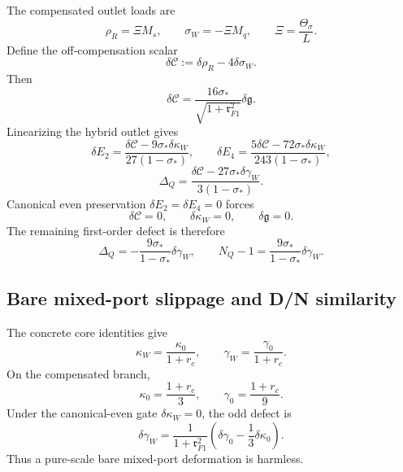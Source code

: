 The compensated outlet loads are
\begin{equation}
\rho_R=\Xi M_s,
\qquad
\sigma_W=-\Xi M_q,
\qquad
\Xi=\frac{\Theta_\sigma}{L}.
\end{equation}
Define the off-compensation scalar
\begin{equation}
\label{eq:app-part04-deltaC-def}
\delta\mathcal C:=\delta\rho_R-4\delta\sigma_W.
\end{equation}
Then
\begin{equation}
\label{eq:app-part04-deltaC-deltag}
\delta\mathcal C
=
\frac{16\sigma_*}{\sqrt{1+\mathfrak r_{F1}^2}}\delta\mathfrak g.
\end{equation}
Linearizing the hybrid outlet gives
\begin{equation}
\label{eq:app-part04-outlet-defects-linear}
\delta E_2=\frac{\delta\mathcal C-9\sigma_*\delta\kappa_W}{27(1-\sigma_*)},
\qquad
\delta E_4=\frac{5\delta\mathcal C-72\sigma_*\delta\kappa_W}{243(1-\sigma_*)},
\end{equation}
\begin{equation}
\label{eq:app-part04-DeltaQ-hybrid-linear}
\Delta_Q=\frac{\delta\mathcal C-27\sigma_*\delta\gamma_W}{3(1-\sigma_*)}.
\end{equation}
Canonical even preservation \(\delta E_2=\delta E_4=0\) forces
\begin{equation}
\label{eq:app-part04-even-gate-forces}
\delta\mathcal C=0,
\qquad
\delta\kappa_W=0,
\qquad
\delta\mathfrak g=0.
\end{equation}
The remaining first-order defect is therefore
\begin{equation}
\label{eq:app-part04-DeltaQ-deltagammaW}
\Delta_Q=-\frac{9\sigma_*}{1-\sigma_*}\delta\gamma_W,
\qquad
N_Q-1=\frac{9\sigma_*}{1-\sigma_*}\delta\gamma_W.
\end{equation}

\subsection{Bare mixed-port slippage and D/N similarity}
\label{subsec:app-part04-bare-slippage}

The concrete core identities give
\begin{equation}
\kappa_W=\frac{\kappa_0}{1+r_c},
\qquad
\gamma_W=\frac{\gamma_0}{1+r_c}.
\end{equation}
On the compensated branch,
\begin{equation}
\kappa_0=\frac{1+r_c}{3},
\qquad
\gamma_0=\frac{1+r_c}{9}.
\end{equation}
Under the canonical-even gate \(\delta\kappa_W=0\), the odd defect is
\begin{equation}
\label{eq:app-part04-delta-gammaW-bare-slippage}
\delta\gamma_W
=
\frac{1}{1+\mathfrak r_{F1}^2}
\left(\delta\gamma_0-\frac13\delta\kappa_0\right).
\end{equation}
Thus a pure-scale bare mixed-port deformation is harmless.

